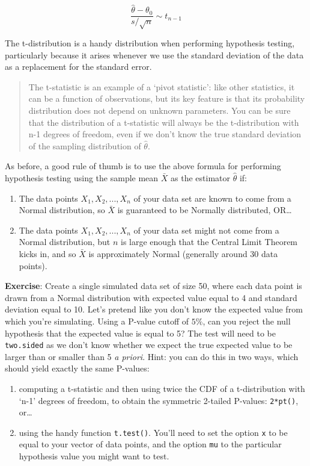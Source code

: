 \documentclass[
]{book}
\begin{document}
\[\frac{\hat{\theta} - \theta_0}{s/\sqrt{n}} \sim t_{n-1}\]

The t-distribution is a handy distribution when performing hypothesis testing, particularly because it arises whenever we use the standard deviation of the data as a replacement for the standard error.

\begin{quote}
The t-statistic is an example of a `pivot statistic': like other statistics, it can be a function of observations, but its key feature is that its probability distribution does not depend on unknown parameters. You can be sure that the distribution of a t-statistic will always be the t-distribution with n-1 degrees of freedom, even if we don't know the true standard deviation of the sampling distribution of \(\hat{\theta}\).
\end{quote}

As before, a good rule of thumb is to use the above formula for performing hypothesis testing using the sample mean \(\bar{X}\) as the estimator \(\hat{\theta}\) if:

\begin{enumerate}
\def\labelenumi{\arabic{enumi}.}
\item
  The data points \(X_1, X_2, ..., X_n\) of your data set are known to come from a Normal distribution, so \(\bar{X}\) is guaranteed to be Normally distributed, OR\ldots{}
\item
  The data points \(X_1, X_2, ..., X_n\) of your data set might not come from a Normal distribution, but \(n\) is large enough that the Central Limit Theorem kicks in, and so \(\bar{X}\) is approximately Normal (generally around 30 data points).
\end{enumerate}

\textbf{Exercise}: Create a single simulated data set of size 50, where each data point is drawn from a Normal distribution with expected value equal to 4 and standard deviation equal to 10. Let's pretend like you don't know the expected value from which you're simulating. Using a P-value cutoff of \(5\%\), can you reject the null hypothesis that the expected value is equal to 5? The test will need to be \texttt{two.sided} as we don't know whether we expect the true expected value to be larger than or smaller than 5 \emph{a priori}.
Hint: you can do this in two ways, which should yield exactly the same P-values:

\begin{enumerate}
\def\labelenumi{\arabic{enumi}.}
\item
  computing a t-statistic and then using twice the CDF of a t-distribution with `n-1' degrees of freedom, to obtain the symmetric 2-tailed P-values: \texttt{2*pt()}, or\ldots{}
\item
  using the handy function \texttt{t.test()}. You'll need to set the option \texttt{x} to be equal to your vector of data points, and the option \texttt{mu} to the particular hypothesis value you might want to test.
\end{enumerate}
\end{document}
